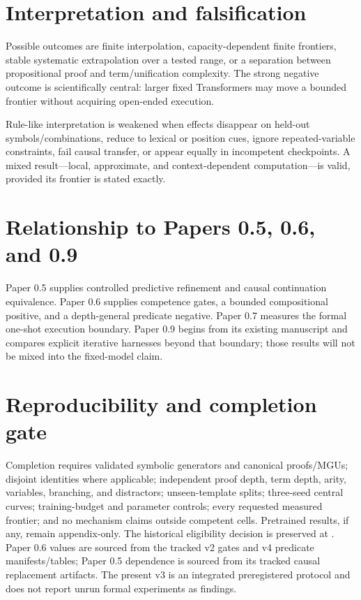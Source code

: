 \documentclass[10pt]{article}
\begin{document}
\section{Interpretation and falsification}
Possible outcomes are finite interpolation, capacity-dependent finite frontiers, stable systematic extrapolation over a tested range, or a separation between propositional proof and term/unification complexity. The strong negative outcome is scientifically central: larger fixed Transformers may move a bounded frontier without acquiring open-ended execution.

Rule-like interpretation is weakened when effects disappear on held-out symbols/combinations, reduce to lexical or position cues, ignore repeated-variable constraints, fail causal transfer, or appear equally in incompetent checkpoints. A mixed result---local, approximate, and context-dependent computation---is valid, provided its frontier is stated exactly.

\section{Relationship to Papers 0.5, 0.6, and 0.9}
Paper 0.5 supplies controlled predictive refinement and causal continuation equivalence. Paper 0.6 supplies competence gates, a bounded compositional positive, and a depth-general predicate negative. Paper 0.7 measures the formal one-shot execution boundary. Paper 0.9 begins from its existing manuscript and compares explicit iterative harnesses beyond that boundary; those results will not be mixed into the fixed-model claim.

\section{Reproducibility and completion gate}
Completion requires validated symbolic generators and canonical proofs/MGUs; disjoint identities where applicable; independent proof depth, term depth, arity, variables, branching, and distractors; unseen-template splits; three-seed central curves; training-budget and parameter controls; every requested measured frontier; and no mechanism claims outside competent cells. Pretrained results, if any, remain appendix-only. The historical eligibility decision is preserved at . Paper 0.6 values are sourced from the tracked v2 gates and v4 predicate manifests/tables; Paper 0.5 dependence is sourced from its tracked causal replacement artifacts. The present v3 is an integrated preregistered protocol and does not report unrun formal experiments as findings.
\end{document}
